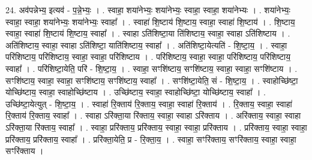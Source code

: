 \documentclass[17pt]{extarticle}
\begin{document}
24. अव॑पन्नेभ्य॒ इत्यव॑ - प॒न्ने॒भ्यः॒ । . स्वाहा॒ शया॑नेभ्यः॒ शया॑नेभ्यः॒ स्वाहा॒ स्वाहा॒ शया॑नेभ्यः । . शया॑नेभ्यः॒ स्वाहा॒ स्वाहा॒ शया॑नेभ्यः॒ शया॑नेभ्यः॒ स्वाहा᳚ । . स्वाहा॑ शि॒ष्टाय॑ शि॒ष्टाय॒ स्वाहा॒ स्वाहा॑ शि॒ष्टाय॑ । . शि॒ष्टाय॒ स्वाहा॒ स्वाहा॑ शि॒ष्टाय॑ शि॒ष्टाय॒ स्वाहा᳚ । . स्वाहा ऽति॑शिष्टा॒या ति॑शिष्टाय॒ स्वाहा॒ स्वाहा ऽति॑शिष्टाय । . अति॑शिष्टाय॒ स्वाहा॒ स्वाहा ऽति॑शिष्टा॒ याति॑शिष्टाय॒ स्वाहा᳚ । . अति॑शिष्टा॒येत्यति॑ - शि॒ष्टा॒य॒ । . स्वाहा॒ परि॑शिष्टाय॒ परि॑शिष्टाय॒ स्वाहा॒ स्वाहा॒ परि॑शिष्टाय । . परि॑शिष्टाय॒ स्वाहा॒ स्वाहा॒ परि॑शिष्टाय॒ परि॑शिष्टाय॒ स्वाहा᳚ । . परि॑शिष्टा॒येति॒ परि॑ - शि॒ष्टा॒य॒ । . स्वाहा॒ सꣳशि॑ष्टाय॒ सꣳशि॑ष्टाय॒ स्वाहा॒ स्वाहा॒ सꣳशि॑ष्टाय । . सꣳशि॑ष्टाय॒ स्वाहा॒ स्वाहा॒ सꣳशि॑ष्टाय॒ सꣳशि॑ष्टाय॒ स्वाहा᳚ । . सꣳशि॑ष्टा॒येति॒ सं - शि॒ष्टा॒य॒ । . स्वाहोच्छि॑ष्टा॒ योच्छि॑ष्टाय॒ स्वाहा॒ स्वाहोच्छि॑ष्टाय । . उच्छि॑ष्टाय॒ स्वाहा॒ स्वाहोच्छि॑ष्टा॒ योच्छि॑ष्टाय॒ स्वाहा᳚ । . उच्छि॑ष्टा॒येत्युत् - शि॒ष्टा॒य॒ । . स्वाहा॑ रि॒क्ताय॑ रि॒क्ताय॒ स्वाहा॒ स्वाहा॑ रि॒क्ताय॑ । . रि॒क्ताय॒ स्वाहा॒ स्वाहा॑ रि॒क्ताय॑ रि॒क्ताय॒ स्वाहा᳚ । . स्वाहा ऽरि॑क्ता॒या रि॑क्ताय॒ स्वाहा॒ स्वाहा ऽरि॑क्ताय । . अरि॑क्ताय॒ स्वाहा॒ स्वाहा ऽरि॑क्ता॒या रि॑क्ताय॒ स्वाहा᳚ । . स्वाहा॒ प्ररि॑क्ताय॒ प्ररि॑क्ताय॒ स्वाहा॒ स्वाहा॒ प्ररि॑क्ताय । . प्ररि॑क्ताय॒ स्वाहा॒ स्वाहा॒ प्ररि॑क्ताय॒ प्ररि॑क्ताय॒ स्वाहा᳚ । . प्ररि॑क्ता॒येति॒ प्र - रि॒क्ता॒य॒ । . स्वाहा॒ सꣳरि॑क्ताय॒ सꣳरि॑क्ताय॒ स्वाहा॒ स्वाहा॒ सꣳरि॑क्ताय । \newline
\end{document}
